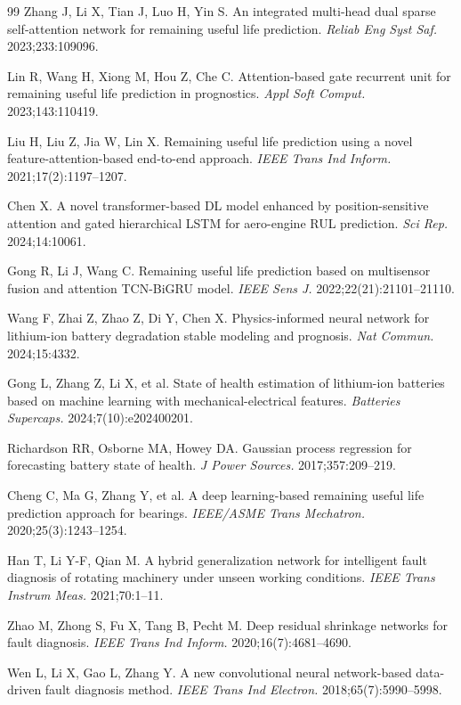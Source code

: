 \documentclass[AMA,Times1COL]{WileyNJDv5}
\begin{document}
\begin{thebibliography}{99}
Zhang J, Li X, Tian J, Luo H, Yin S.
An integrated multi-head dual sparse self-attention network for
remaining useful life prediction.
\textit{Reliab Eng Syst Saf.} 2023;233:109096.

Lin R, Wang H, Xiong M, Hou Z, Che C.
Attention-based gate recurrent unit for remaining useful life prediction
in prognostics.
\textit{Appl Soft Comput.} 2023;143:110419.

Liu H, Liu Z, Jia W, Lin X.
Remaining useful life prediction using a novel feature-attention-based
end-to-end approach.
\textit{IEEE Trans Ind Inform.} 2021;17(2):1197--1207.

Chen X.
A novel transformer-based DL model enhanced by position-sensitive
attention and gated hierarchical LSTM for aero-engine RUL prediction.
\textit{Sci Rep.} 2024;14:10061.

Gong R, Li J, Wang C.
Remaining useful life prediction based on multisensor fusion and
attention TCN-BiGRU model.
\textit{IEEE Sens J.} 2022;22(21):21101--21110.

Wang F, Zhai Z, Zhao Z, Di Y, Chen X.
Physics-informed neural network for lithium-ion battery degradation
stable modeling and prognosis.
\textit{Nat Commun.} 2024;15:4332.

Gong L, Zhang Z, Li X, et al.
State of health estimation of lithium-ion batteries based on machine
learning with mechanical-electrical features.
\textit{Batteries Supercaps.} 2024;7(10):e202400201.

Richardson RR, Osborne MA, Howey DA.
Gaussian process regression for forecasting battery state of health.
\textit{J Power Sources.} 2017;357:209--219.

Cheng C, Ma G, Zhang Y, et al.
A deep learning-based remaining useful life prediction approach
for bearings.
\textit{IEEE/ASME Trans Mechatron.} 2020;25(3):1243--1254.

Han T, Li Y-F, Qian M.
A hybrid generalization network for intelligent fault diagnosis of
rotating machinery under unseen working conditions.
\textit{IEEE Trans Instrum Meas.} 2021;70:1--11.

Zhao M, Zhong S, Fu X, Tang B, Pecht M.
Deep residual shrinkage networks for fault diagnosis.
\textit{IEEE Trans Ind Inform.} 2020;16(7):4681--4690.

Wen L, Li X, Gao L, Zhang Y.
A new convolutional neural network-based data-driven fault diagnosis method.
\textit{IEEE Trans Ind Electron.} 2018;65(7):5990--5998.


\end{thebibliography}
\end{document}
